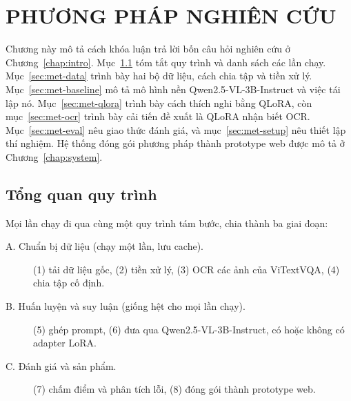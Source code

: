 
\chapter{PHƯƠNG PHÁP NGHIÊN CỨU}
\label{chap:methods}

\ifpdf
    \graphicspath{{Chapter4/Figs/Raster/}{Chapter4/Figs/PDF/}{Chapter4/Figs/}}
\else
    \graphicspath{{Chapter4/Figs/Vector/}{Chapter4/Figs/}}
\fi


Chương này mô tả cách khóa luận trả lời bốn câu hỏi nghiên cứu ở
Chương~\ref{chap:intro}. Mục~\ref{sec:met-overview} tóm tắt quy trình và danh
sách các lần chạy. Mục~\ref{sec:met-data} trình bày hai bộ dữ liệu, cách chia tập
và tiền xử lý. Mục~\ref{sec:met-baseline} mô tả mô hình nền Qwen2.5-VL-3B-Instruct
và việc tái lập nó. Mục~\ref{sec:met-qlora} trình bày cách thích nghi bằng QLoRA,
còn mục~\ref{sec:met-ocr} trình bày cải tiến đề xuất là QLoRA nhận biết OCR.
Mục~\ref{sec:met-eval} nêu giao thức đánh giá, và mục~\ref{sec:met-setup} nêu
thiết lập thí nghiệm. Hệ thống đóng gói phương pháp thành prototype web được mô tả ở
Chương~\ref{chap:system}.

\section{Tổng quan quy trình}
\label{sec:met-overview}

Mọi lần chạy đi qua cùng một quy trình tám bước, chia thành ba giai đoạn:

\begin{description}
  \item[A. Chuẩn bị dữ liệu (chạy một lần, lưu cache).] (1) tải dữ liệu gốc,
  (2) tiền xử lý, (3) OCR các ảnh của ViTextVQA, (4) chia tập cố định.
  \item[B. Huấn luyện và suy luận (giống hệt cho mọi lần chạy).] (5) ghép prompt,
  (6) đưa qua Qwen2.5-VL-3B-Instruct, có hoặc không có adapter LoRA.
  \item[C. Đánh giá và sản phẩm.] (7) chấm điểm và phân tích lỗi, (8) đóng gói
  thành prototype web.
\end{description}

